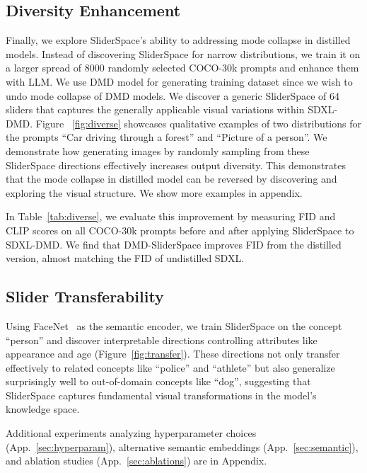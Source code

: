 \subsection{Diversity Enhancement} \label{sec:diverse_exp}
Finally, we explore SliderSpace's ability to addressing mode collapse in distilled models. Instead of discovering SliderSpace for narrow distributions, we train it on a larger spread of 8000 randomly selected COCO-30k prompts and enhance them with LLM. We use DMD model for generating training dataset since we wish to undo mode collapse of DMD models. We discover a generic SliderSpace of 64 sliders that captures the generally applicable visual variations within SDXL-DMD. Figure ~\ref{fig:diverse} showcases qualitative examples of two distributions for the prompts ``Car driving through a forest'' and ``Picture of a person''. We demonstrate how generating images by randomly sampling from these SliderSpace directions effectively increases output diversity. This demonstrates that the mode collapse in distilled model can be reversed by discovering and exploring the visual structure. We show more examples in appendix.


In Table~\ref{tab:diverse}, we evaluate this improvement by measuring FID and CLIP scores on all COCO-30k prompts before and after applying SliderSpace to SDXL-DMD. We find that DMD-SliderSpace improves FID from the distilled version, almost matching the FID of undistilled SDXL. 


\subsection{Slider Transferability}
Using FaceNet~\cite{schroff2015facenet} as the semantic encoder, we train SliderSpace on the concept ``person'' and discover interpretable directions controlling attributes like appearance and age (Figure~\ref{fig:transfer}). These directions not only transfer effectively to related concepts like ``police'' and ``athlete'' but also generalize surprisingly well to out-of-domain concepts like ``dog'', suggesting that SliderSpace captures fundamental visual transformations in the model's knowledge space.


Additional experiments analyzing hyperparameter choices (App.~\ref{sec:hyperparam}), alternative semantic embeddings (App.~\ref{sec:semantic}), and ablation studies (App.~\ref{sec:ablations}) are in Appendix.